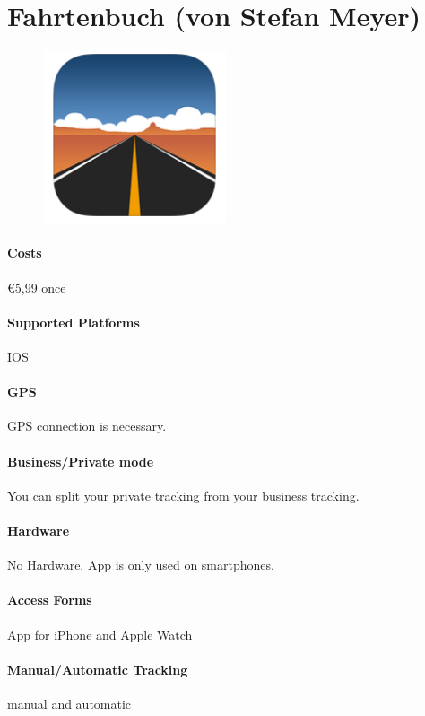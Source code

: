 \section{Fahrtenbuch (von Stefan Meyer)}
\begin{figure}
  \begin{center}
    \includegraphics[width=0.48\textwidth]{bilder/fahrtenbuch}
  \end{center}
\end{figure}
\paragraph{Costs} \euro 5,99 once
\paragraph{Supported Platforms} IOS
\paragraph{GPS} GPS connection is necessary.
\paragraph{Business/Private mode} You can split your private tracking from your business tracking.
\paragraph{Hardware} No Hardware. App is only used on smartphones.
\paragraph{Access Forms} App for iPhone and Apple Watch
\paragraph{Manual/Automatic Tracking} manual and automatic
